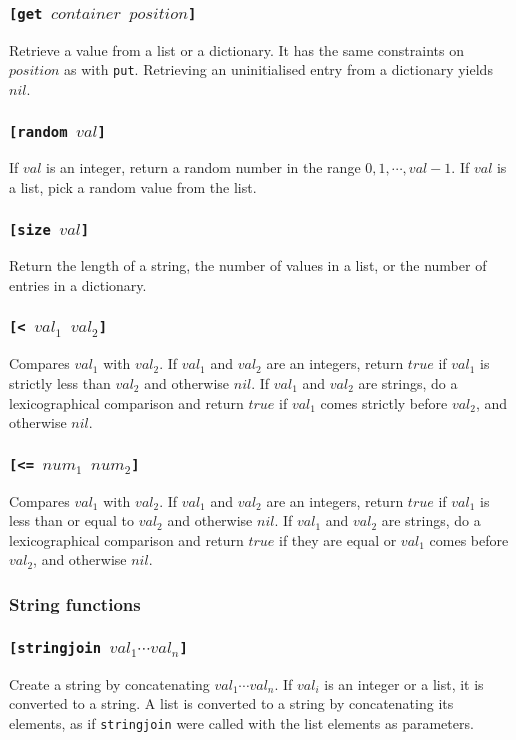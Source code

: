 \documentclass[11pt]{report}
\begin{document}
\subsubsection*{\tt{[get }$container$ $position$\tt{]}}
Retrieve a value from a list or a dictionary. It has the same constraints on $position$ as with \verb|put|. Retrieving an uninitialised entry from a dictionary yields $nil$.
\subsubsection*{\tt{[random }$val$\tt{]}}
If $val$ is an integer, return a random number in the range $0,1, \cdots, val -1$. If $val$ is a list, pick a random value from the list.
\subsubsection*{\tt{[size }$val$\tt{]}}
Return the length of a string, the number of values in a list, or the number of entries in a dictionary.
\subsubsection*{\tt{[< }$val_1$ $val_2$\tt{]}}
Compares $val_1$ with $val_2$. If $val_1$ and $val_2$ are an integers, return $true$ if $val_1$ is strictly less than $val_2$ and otherwise $nil$.
If $val_1$ and $val_2$ are strings, do a lexicographical comparison and return $true$ if $val_1$ comes strictly before $val_2$, and otherwise $nil$.
\subsubsection*{\tt{[<= }$num_1$ $num_2$\tt{]}}
Compares $val_1$ with $val_2$. If $val_1$ and $val_2$ are an integers, return $true$ if $val_1$ is less than or equal to $val_2$ and otherwise $nil$.
If $val_1$ and $val_2$ are strings, do a lexicographical comparison and return $true$ if they are equal or $val_1$ comes before $val_2$, and otherwise $nil$.

\subsubsection{String functions}
\subsubsection*{\tt{[stringjoin }$val_1\cdots val_n$\tt{]}}
Create a string by concatenating $val_1\cdots val_n$.
If $val_i$ is an integer or a list, it is converted to a string.
A list is converted to a string by concatenating its elements, as if {\tt stringjoin} were called with the list elements as parameters.
\end{document}
